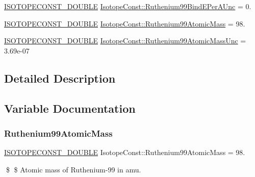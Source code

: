 \begin{DoxyCompactItemize}
\mbox{\hyperlink{group___isotope_const-_macros_ga8f45a7272ce02c0b4c65c44636ed719a}{I\+S\+O\+T\+O\+P\+E\+C\+O\+N\+S\+T\+\_\+\+D\+O\+U\+B\+LE}} \mbox{\hyperlink{group___isotope_const-_ruthenium-_ru99_gaaff5f9a6a1315edb5d6be9127b87d78a}{Isotope\+Const\+::\+Ruthenium99\+Bind\+E\+Per\+A\+Unc}} = 0.
\item 
\mbox{\hyperlink{group___isotope_const-_macros_ga8f45a7272ce02c0b4c65c44636ed719a}{I\+S\+O\+T\+O\+P\+E\+C\+O\+N\+S\+T\+\_\+\+D\+O\+U\+B\+LE}} \mbox{\hyperlink{group___isotope_const-_ruthenium-_ru99_ga24bd86c2123051fc5ad38ed004a7f7c0}{Isotope\+Const\+::\+Ruthenium99\+Atomic\+Mass}} = 98.
\item 
\mbox{\hyperlink{group___isotope_const-_macros_ga8f45a7272ce02c0b4c65c44636ed719a}{I\+S\+O\+T\+O\+P\+E\+C\+O\+N\+S\+T\+\_\+\+D\+O\+U\+B\+LE}} \mbox{\hyperlink{group___isotope_const-_ruthenium-_ru99_ga125d14e1ecb69dd353fa5c59ce3a392c}{Isotope\+Const\+::\+Ruthenium99\+Atomic\+Mass\+Unc}} = 3.\+69e-\/07
\end{DoxyCompactItemize}


\subsection{Detailed Description}


\subsection{Variable Documentation}
\mbox{\label{group___isotope_const-_ruthenium-_ru99_ga24bd86c2123051fc5ad38ed004a7f7c0}} 
\subsubsection{\texorpdfstring{Ruthenium99\+Atomic\+Mass}{Ruthenium99AtomicMass}}
{\footnotesize\ttfamily \mbox{\hyperlink{group___isotope_const-_macros_ga8f45a7272ce02c0b4c65c44636ed719a}{I\+S\+O\+T\+O\+P\+E\+C\+O\+N\+S\+T\+\_\+\+D\+O\+U\+B\+LE}} Isotope\+Const\+::\+Ruthenium99\+Atomic\+Mass = 98.}

\$ \$ Atomic mass of Ruthenium-\/99 in amu. \mbox{\label{group___isotope_const-_ruthenium-_ru99_ga125d14e1ecb69dd353fa5c59ce3a392c}} 
